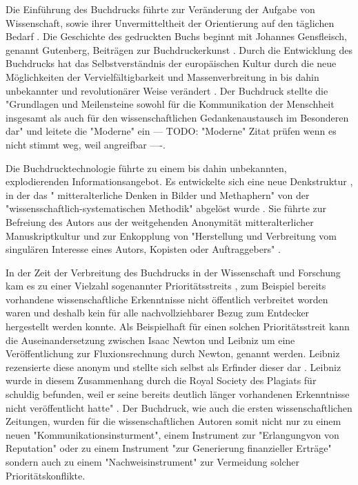 Die Einführung des Buchdrucks führte zur Veränderung der Aufgabe von Wissenschaft, sowie ihrer Unvermitteltheit der Orientierung auf den täglichen Bedarf \cite{Luhmann1998}. Die Geschichte des gedruckten Buchs beginnt mit Johannes Gensfleisch, genannt Gutenberg, Beiträgen zur Buchdruckerkunst \cite{wittmann_1999_geschichte}. Durch die Entwicklung des Buchdrucks hat das Selbstverständnis der europäischen Kultur durch die neue Möglichkeiten der Vervielfältigbarkeit und Massenverbreitung in bis dahin unbekannter \cite{giesecke_1991_buchdruck} und revolutionärer Weise verändert \cite{wunderlich_2008_buchdruck}. Der Buchdruck stellte die "Grundlagen und Meilensteine sowohl für die Kommunikation der Menschheit insgesamt als auch für den wissenschaftlichen Gedankenaustausch im Besonderen dar" \cite{schirmbacher_2009_wisspub} und leitete die "Moderne" ein \cite{luhmann_1997_gesellschaft} --- TODO: "Moderne" Zitat prüfen wenn es nicht stimmt weg, weil angreifbar ----. 

Die Buchdrucktechnologie führte zu einem bis dahin unbekannten, explodierenden Informationsangebot. Es entwickelte sich eine neue Denkstruktur \cite{eisenstein_1997_druckerpresse}, in der das " mitteralterliche Denken in Bilder und Methaphern" von der "wissensschaftlich-systematischen Methodik" abgelöst wurde \cite{wunderlich_2008_buchdruck}. Sie führte zur Befreiung des Autors aus der weitgehenden Anonymität mitteralterlicher Manuskriptkultur und zur Enkopplung von "Herstellung und Verbreitung vom singulären Interesse eines Autors, Kopisten oder Auftraggebers"\cite{wunderlich_2008_buchdruck} \cite{schirmbacher_2009_wisspub}. 

In der Zeit der Verbreitung des Buchdrucks in der Wissenschaft und Forschung kam es zu einer Vielzahl sogenannter Prioritätsstreits \cite{schirmbacher_2009_wisspub}, zum Beispiel bereits vorhandene wissenschaftliche Erkenntnisse nicht öffentlich verbreitet worden waren und deshalb kein für alle nachvollziehbarer Bezug zum Entdecker hergestellt werden konnte. Als Beispielhaft für einen solchen Prioritätsstreit kann die Auseinandersetzung zwischen Isaac Newton und Leibniz um eine Veröffentlichung zur Fluxionsrechnung durch Newton, genannt werden. Leibniz rezensierte diese anonym und stellte sich selbst als Erfinder dieser dar \cite{2013_leibniz}. Leibniz wurde in diesem Zusammenhang durch die Royal Society des Plagiats für schuldig befunden, weil er seine bereits deutlich länger vorhandenen Erkenntnisse nicht veröffentlicht hatte" \cite{schirmbacher_2009_wisspub}. Der Buchdruck, wie auch die ersten wissenschaftlichen Zeitungen, wurden für die wissenschaftlichen Autoren somit nicht nur zu einem neuen "Kommunikationsinsturment", einem Instrument zur "Erlangungvon von Reputation" oder zu einem Instrument "zur Generierung finanzieller Erträge" sondern auch zu einem "Nachweisinstrument" \cite{wunderlich_2008_buchdruck} \cite{schirmbacher_2009_wisspub} zur Vermeidung solcher Prioritätskonflikte. 

